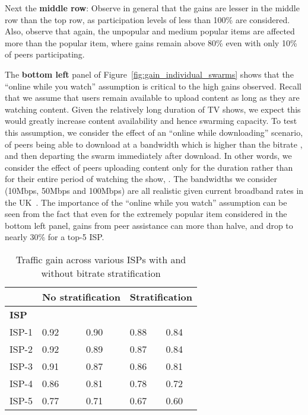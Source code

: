 \documentclass[10pt, conference, letterpaper]{IEEEtran}
\begin{document}
Next the \textbf{middle row}: Observe in general that the gains are lesser in the middle row than the top row, as participation levels of less than 100\% are considered. Also, observe that again, the unpopular and medium popular items are affected more than the popular item, where gains remain above 80\% even with only 10\% of peers participating. 

 
	
The \textbf{bottom left} panel of Figure~\ref{fig:gain_individual_swarms} shows that the ``online while you watch'' assumption is critical to the high gains observed. Recall that we assume that users remain available to upload content as long as they are watching content. Given the relatively long duration of TV shows, we expect this would greatly increase content availability and hence swarming capacity. To test this assumption, we consider the effect of an ``online while downloading'' scenario, of peers being able to download at a bandwidth  which is higher than the bitrate , and then departing the swarm immediately after download. In other words, we consider the effect of peers uploading content only for the duration  rather than for their entire period of watching the show, . The bandwidths  we consider (10Mbps, 50Mbps and 100Mbps) are all realistic given current broadband rates in the UK~\cite{ofcom2014speed}. The importance of the ``online while you watch'' assumption can be seen from the fact that even for the extremely popular item considered in the bottom left panel, gains from peer assistance can more than halve, and drop to nearly 30\% for a top-5 ISP.

\begin{table}
\small{
 \begin{center}
		\begin{tabular}{|l|l|l||l|l|}
			\cline{2-5} 
			\multicolumn{1}{l|}{} & \multicolumn{2}{c||}{No stratification} & \multicolumn{2}{c|}{Stratification}\\ \hline
			\textbf{ISP} & \textbf{}  
			& \textbf{} & \textbf{} & \textbf{} \\ \hline
			ISP-1 & 0.92 & 0.90 & 0.88 & 0.84 \\ \hline
			ISP-2 & 0.92 & 0.89 & 0.87 & 0.84 \\ \hline
			ISP-3 & 0.91 & 0.87 & 0.86 & 0.81 \\ \hline
			ISP-4 & 0.86 & 0.81 & 0.78 & 0.72 \\ \hline
			ISP-5 & 0.77 & 0.71 & 0.67 & 0.60 \\ \hline   

		\end{tabular} 
	\end{center}
	\caption{Traffic gain across various ISPs with and without bitrate stratification}
	\label{tab:cd_gain_multi_swarm}}
\end{table}
	
\end{document}
